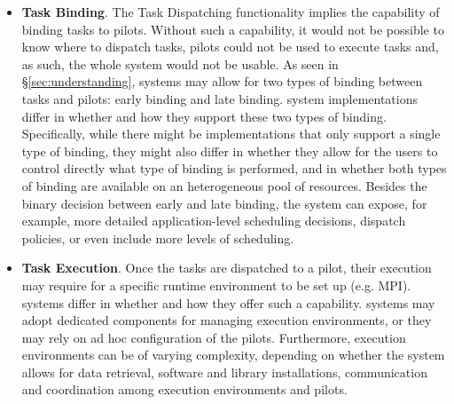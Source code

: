 \documentclass{sig-alternate}
\begin{document}
\begin{itemize}





\item \textbf{Task Binding}. The Task Dispatching functionality implies the
  capability of binding tasks to pilots. Without such a capability, it would
  not be possible to know where to dispatch tasks, pilots could not be used to
  execute tasks and, as such, the whole \pilot system would not be usable. As
  seen in \S\ref{sec:understanding}, \pilot systems may allow for two types of
  binding between tasks and pilots: early binding and late binding. \pilot
  system implementations differ in whether and how they support these two types
  of binding. Specifically, while there might be implementations that only
  support a single type of binding, they might also differ in whether they allow
  for the users to control directly what type of binding is performed, and in
  whether both types of binding are available on an heterogeneous pool of
  resources. Besides the binary decision between early and late binding, the
  \pilot system can expose, for example, more detailed application-level
  scheduling decisions, dispatch policies, or even include more levels of
  scheduling.

\item \textbf{Task Execution}. Once the tasks are dispatched to a pilot, their
  execution may require for a specific runtime environment to be set up (e.g.
  MPI). \pilot systems differ in whether and how they offer such a capability.
  \pilot systems may adopt dedicated components for managing execution
  environments, or they may rely on ad hoc configuration of the pilots.
  Furthermore, execution environments can be of varying complexity, depending on
  whether the \pilot system allows for data retrieval, software and library
  installations, communication and coordination among execution environments and
  pilots.


\end{itemize}
\end{document}
